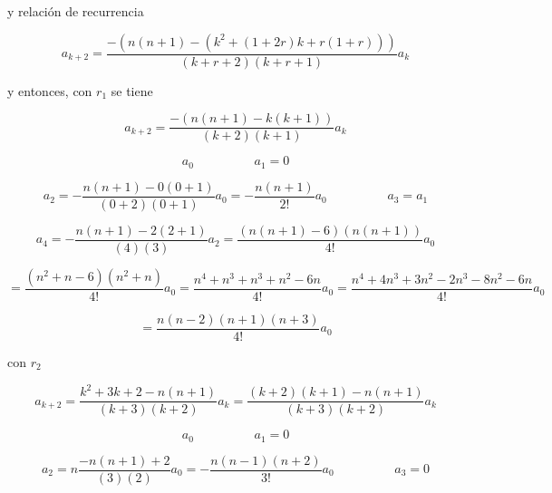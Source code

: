 \documentclass[12pt,a4paper]{article}
\begin{document}
\begin{enumerate}
    y relación de recurrencia
    
    \begin{equation*}
        a_{k+2} = \frac{-(n(n+1)-(k^2+(1+2r)k+r(1+r)))}{(k+r+2)(k+r+1)}a_k
    \end{equation*}

     y entonces, con $r_1$ se tiene
     
     \begin{equation*}
         a_{k+2} = \frac{-(n(n+1)-k(k+1))}{(k+2)(k+1)}a_k
     \end{equation*}
     
     \begin{equation*}
          a_0 \hspace{2cm}  a_1 = 0 
     \end{equation*}
     
     \begin{equation*}
         a_2 =-\frac{n(n+1)- 0(0+1)}{(0+2)(0+1)}a_0=-\frac{n(n+1)}{2!}a_0  \hspace{2cm} a_3 = a_1
     \end{equation*}
     
     \begin{equation*}
         a_4 = -\frac{n(n+1)-2(2+1)}{(4)(3)}a_2 = \frac{(n(n+1)-6)(n(n+1))}{4!}a_0
     \end{equation*}
     
     \begin{equation*}
         = \frac{(n^2+n-6)(n^2+n)}{4!}a_0 = \frac{n^4 +n^3 + n^3 +n^2 -6n}{4!} a_0= \frac{n^4 +4n^3+3n^2 -2n^3-8n^2-6n}{4!}a_0
     \end{equation*}
     
     \begin{equation*}
         =\frac{n(n-2)(n+1)(n+3)}{4!}a_0
     \end{equation*}
     
     con $r_2$
     
     \begin{equation*}
         a_{k+2} = \frac{k^2+3k+2-n(n+1)}{(k+3)(k+2)}a_k = \frac{(k+2)(k+1)-n(n+1)}{(k+3)(k+2)}a_k
     \end{equation*}
     
     \begin{equation*}
        a_0 \hspace{2cm} a_1 = 0 
     \end{equation*}
     
     \begin{equation*}
         a_2 =n \frac{-n(n+1)+2}{(3)(2)}a_0= -\frac{n(n-1)(n+2)}{3!}a_0 \hspace{2cm} a_3 = 0
     \end{equation*}
     

\end{enumerate}
\end{document}
